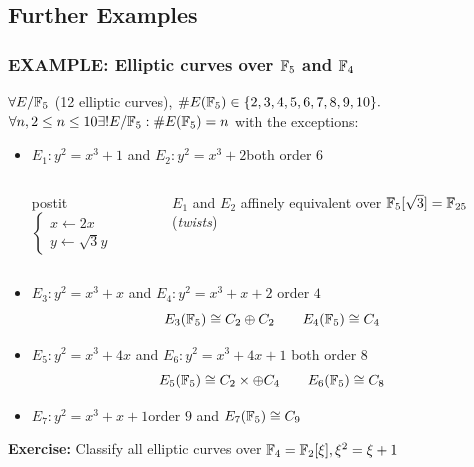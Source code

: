 \documentclass[10pt,handout]{beamer} %
\begin{document}
\subsection{Further Examples}
\begin{frame}
\frametitle{EXAMPLE: Elliptic curves over $\mathbb F_5$ and $\mathbb F_4$}

$\forall E/\mathbb F_5$ (12 elliptic curves), $\#E(\mathbb F_5)\in \{2,3,4,5,6,7,8,9,10\}.$ $\forall n, 2\le n\le10 \exists! E/\mathbb F_5: \#E(\mathbb F_5)=n$
with the exceptions:

\begin{example}
\begin{itemize}[<+-| alert@+>]
 \item \alert{$E_1: y^2=x^3+1$} and \alert{$E_2: y^2=x^3+2$}\hfill both order $6$\\
 \begin{columns}
\begin{column}{4cm}
\begin{beamercolorbox}[shadow=true,center,rounded=true,wd=2.5cm]{postit}
        $\begin{cases}
x\longleftarrow 2x\\
y\longleftarrow \sqrt{3}y
  \end{cases}$\end{beamercolorbox}
 \end{column}
 \begin{column}{5cm}
$E_1$ and $E_2$ affinely equivalent over $\mathbb F_5[\sqrt{3}]=\mathbb F_{25}$ (\emph{twists})
 \end{column}
 \end{columns}
\item \alert{$E_3: y^2=x^3+x$} and \alert{$E_4: y^2=x^3+x+2$}
\hfill order $4$
$$E_3(\mathbb F_5)\cong C_2\oplus C_2\qquad E_4(\mathbb F_5)\cong C_4$$
\item \alert{$E_5: y^2=x^3+4x$} and \alert{$E_6: y^2=x^3+4x+1$}
\hfill both order $8$
$$E_5(\mathbb F_5)\cong C_2\times\oplus C_4\qquad E_6(\mathbb F_5)\cong C_8$$
\item \alert{$E_7: y^2=x^3+x+1$}\hfill  order $9$ and $E_7(\mathbb F_5)\cong C_9$
\end{itemize}
\end{example}\pause\vspace*{-3pt}
\begin{beamerboxesrounded}[upper=block title example,lower=block body alerted,shadow=true]{\textbf{Exercise:} Classify all elliptic curves over $\mathbb F_4=\mathbb F_2[\xi], \xi^2=\xi+1$}
 \end{beamerboxesrounded}
\end{frame}
\end{document}
